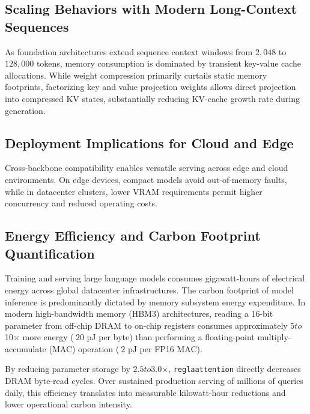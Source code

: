 \subsection{Scaling Behaviors with Modern Long-Context Sequences}
As foundation architectures extend sequence context windows from $2{,}048$ to $128{,}000$ tokens, memory consumption is dominated by transient key-value cache allocations. While weight compression primarily curtails static memory footprints, factorizing key and value projection weights allows direct projection into compressed KV states, substantially reducing KV-cache growth rate during generation.

\subsection{Deployment Implications for Cloud and Edge}
Cross-backbone compatibility enables versatile serving across edge and cloud environments. On edge devices, compact models avoid out-of-memory faults, while in datacenter clusters, lower VRAM requirements permit higher concurrency and reduced operating costs.

\subsection{Energy Efficiency and Carbon Footprint Quantification}
Training and serving large language models consumes gigawatt-hours of electrical energy across global datacenter infrastructures. The carbon footprint of model inference is predominantly dictated by memory subsystem energy expenditure. In modern high-bandwidth memory (HBM3) architectures, reading a 16-bit parameter from off-chip DRAM to on-chip registers consumes approximately $5$\times$ to $10$\times$ more energy ($~20$ pJ per byte) than performing a floating-point multiply-accumulate (MAC) operation ($~2$ pJ per FP16 MAC).

By reducing parameter storage by $2.5$\times$ to $3.0$\times$, \texttt{reglaattention} directly decreases DRAM byte-read cycles. Over sustained production serving of millions of queries daily, this efficiency translates into measurable kilowatt-hour reductions and lower operational carbon intensity.
